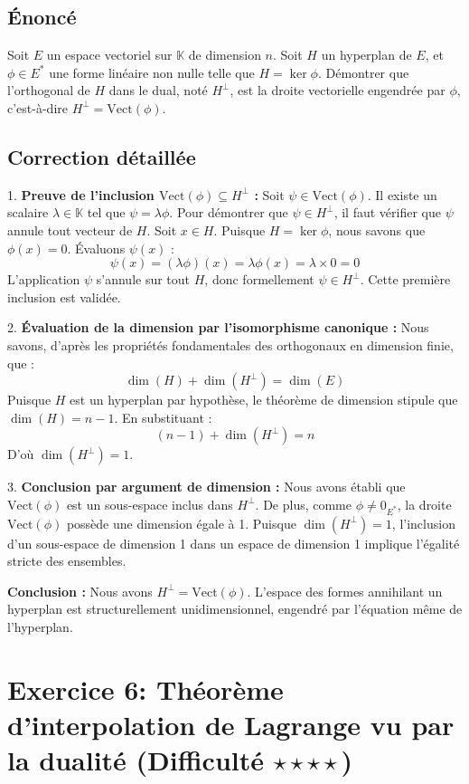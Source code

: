 \documentclass[11pt,a4paper]{report}
\begin{document}
\subsection{Énoncé}
Soit $E$ un espace vectoriel sur $\mathbb{K}$ de dimension $n$. Soit $H$ un hyperplan de $E$, et $\phi \in E^*$ une forme linéaire non nulle telle que $H = \ker \phi$. Démontrer que l'orthogonal de $H$ dans le dual, noté $H^\perp$, est la droite vectorielle engendrée par $\phi$, c'est-à-dire $H^\perp = \text{Vect}(\phi)$.

\subsection{Correction détaillée}

1. \textbf{Preuve de l'inclusion $\text{Vect}(\phi) \subseteq H^\perp$ :}
   Soit $\psi \in \text{Vect}(\phi)$. Il existe un scalaire $\lambda \in \mathbb{K}$ tel que $\psi = \lambda \phi$.
   Pour démontrer que $\psi \in H^\perp$, il faut vérifier que $\psi$ annule tout vecteur de $H$.
   Soit $x \in H$. Puisque $H = \ker \phi$, nous savons que $\phi(x) = 0$.
   Évaluons $\psi(x)$ :
   $$\psi(x) = (\lambda \phi)(x) = \lambda \phi(x) = \lambda \times 0 = 0$$
   L'application $\psi$ s'annule sur tout $H$, donc formellement $\psi \in H^\perp$.
   Cette première inclusion est validée.

2. \textbf{Évaluation de la dimension par l'isomorphisme canonique :}
   Nous savons, d'après les propriétés fondamentales des orthogonaux en dimension finie, que :
   $$\dim(H) + \dim(H^\perp) = \dim(E)$$
   Puisque $H$ est un hyperplan par hypothèse, le théorème de dimension stipule que $\dim(H) = n - 1$.
   En substituant :
   $$(n - 1) + \dim(H^\perp) = n$$
   D'où $\dim(H^\perp) = 1$.

3. \textbf{Conclusion par argument de dimension :}
   Nous avons établi que $\text{Vect}(\phi)$ est un sous-espace inclus dans $H^\perp$.
   De plus, comme $\phi \neq 0_{E^*}$, la droite $\text{Vect}(\phi)$ possède une dimension égale à 1.
   Puisque $\dim(H^\perp) = 1$, l'inclusion d'un sous-espace de dimension 1 dans un espace de dimension 1 implique l'égalité stricte des ensembles.

\textbf{Conclusion :}
Nous avons $H^\perp = \text{Vect}(\phi)$. L'espace des formes annihilant un hyperplan est structurellement unidimensionnel, engendré par l'équation même de l'hyperplan.

\section{Exercice 6: Théorème d'interpolation de Lagrange vu par la dualité (Difficulté $\star \star \star \star$)}
\end{document}
